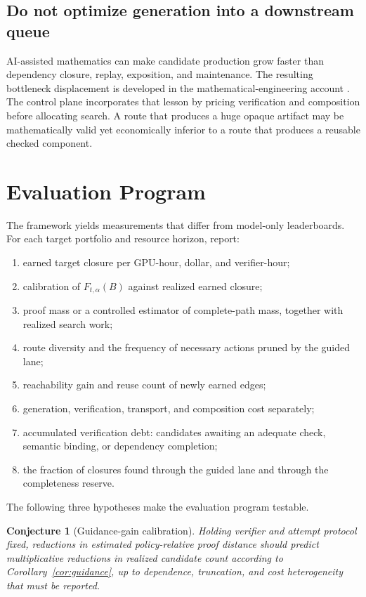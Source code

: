 \documentclass[11pt]{article}
\newtheorem{conjecture}[definition]{Conjecture}
\begin{document}
\subsection{Do not optimize generation into a downstream queue}

AI-assisted mathematics can make candidate production grow faster than
dependency closure, replay, exposition, and maintenance.  The resulting
bottleneck displacement is developed in the mathematical-engineering account
\citep{li2026engineering}.  The control plane incorporates that lesson by
pricing verification and composition before allocating search.  A route that
produces a huge opaque artifact may be mathematically valid yet economically
inferior to a route that produces a reusable checked component.

\section{Evaluation Program}

The framework yields measurements that differ from model-only leaderboards.
For each target portfolio and resource horizon, report:

\begin{enumerate}[leftmargin=*,itemsep=2pt]
  \item earned target closure per GPU-hour, dollar, and verifier-hour;
  \item calibration of $F_{t,\alpha}(B)$ against realized earned closure;
  \item proof mass or a controlled estimator of complete-path mass, together
        with realized search work;
  \item route diversity and the frequency of necessary actions pruned by the
        guided lane;
  \item reachability gain and reuse count of newly earned edges;
  \item generation, verification, transport, and composition cost separately;
  \item accumulated verification debt: candidates awaiting an adequate check,
        semantic binding, or dependency completion;
  \item the fraction of closures found through the guided lane and through the
        completeness reserve.
\end{enumerate}

The following three hypotheses make the evaluation program testable.

\begin{conjecture}[Guidance-gain calibration]\label{conj:guidance-calibration}
Holding verifier and attempt protocol fixed, reductions in estimated
policy-relative proof distance should predict multiplicative reductions in
realized candidate count according to Corollary~\ref{cor:guidance}, up to
dependence, truncation, and cost heterogeneity that must be reported.
\end{conjecture}
\end{document}
